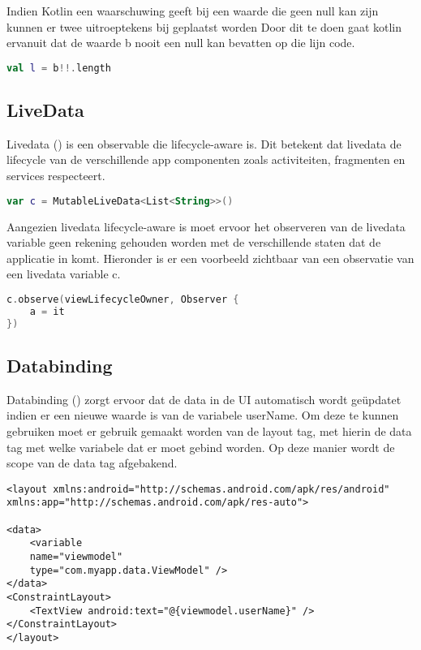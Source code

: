 Indien Kotlin een waarschuwing geeft bij een waarde die geen null kan zijn kunnen er twee uitroeptekens bij geplaatst worden Door dit te doen gaat kotlin ervanuit dat de waarde b nooit een null kan bevatten op die lijn code.

\begin{lstlisting}[caption=Waarschuwing null safty overschrijven, language=Kotlin]
val l = b!!.length
\end{lstlisting}


\subsection{LiveData}
Livedata (\cite{LIVEDATA}) is een observable die lifecycle-aware is. Dit betekent dat livedata de lifecycle van de verschillende app componenten zoals activiteiten, fragmenten en services respecteert.

\begin{lstlisting}[caption=LiveData, language=Kotlin]
var c = MutableLiveData<List<String>>()
\end{lstlisting}


Aangezien livedata lifecycle-aware is moet ervoor het observeren van de livedata variable geen rekening gehouden worden met de verschillende staten dat de applicatie in komt. Hieronder is er een voorbeeld zichtbaar van een observatie van een livedata variable c.

\begin{lstlisting}[caption=Observe liveData, language=Kotlin]
c.observe(viewLifecycleOwner, Observer {
	a = it
})
\end{lstlisting}


\subsection{Databinding}
Databinding (\cite{KOTLIN_DATABINDING}) zorgt ervoor dat de data in de UI automatisch wordt geüpdatet indien er een nieuwe waarde is van de variabele userName. Om deze te kunnen gebruiken moet er gebruik gemaakt worden van de layout tag, met hierin de data tag met welke variabele dat er moet gebind worden. Op deze manier wordt de scope van de data tag afgebakend. 

\begin{lstlisting}[caption=Databinding]
<layout xmlns:android="http://schemas.android.com/apk/res/android"
xmlns:app="http://schemas.android.com/apk/res-auto">

<data>
	<variable 
	name="viewmodel"
	type="com.myapp.data.ViewModel" />
</data>
<ConstraintLayout>
	<TextView android:text="@{viewmodel.userName}" />
</ConstraintLayout>
</layout>
\end{lstlisting}


